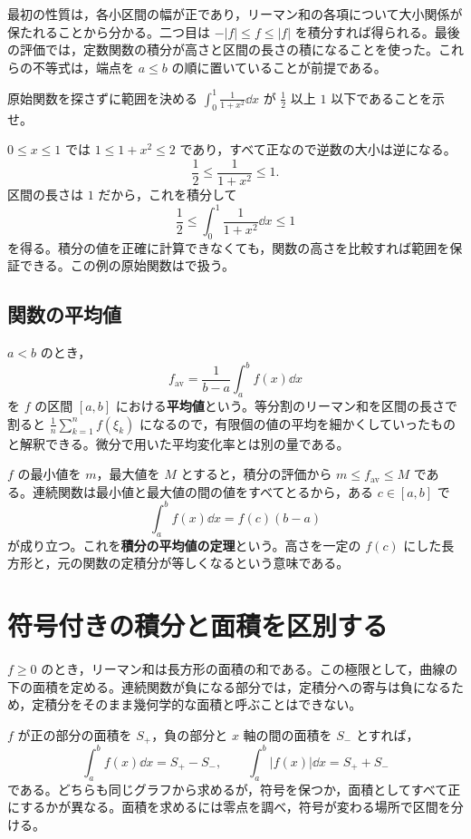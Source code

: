 最初の性質は，各小区間の幅が正であり，リーマン和の各項について大小関係が保たれることから分かる。二つ目は $-|f|\le f\le|f|$ を積分すれば得られる。最後の評価では，定数関数の積分が高さと区間の長さの積になることを使った。これらの不等式は，端点を $a\le b$ の順に置いていることが前提である。

\begin{example}{原始関数を探さずに範囲を決める}
$\int_0^1\frac1{1+x^2}\dd x$ が $\frac12$ 以上 $1$ 以下であることを示せ。
\end{example}
$0\le x\le1$ では $1\le1+x^2\le2$ であり，すべて正なので逆数の大小は逆になる。
\[
 \frac12\le\frac1{1+x^2}\le1.
\]
区間の長さは $1$ だから，これを積分して
\[
 \frac12\le\int_0^1\frac1{1+x^2}\dd x\le1
\]
を得る。積分の値を正確に計算できなくても，関数の高さを比較すれば範囲を保証できる。この例の原始関数はで扱う。

\subsection{関数の平均値}
$a<b$ のとき，
\[
 f_{\mathrm{av}}=\frac1{b-a}\int_a^b f(x)\dd x
\]
を $f$ の区間 $[a,b]$ における\textbf{平均値}という。等分割のリーマン和を区間の長さで割ると $\frac1n\sum_{k=1}^{n}f(\xi_k)$ になるので，有限個の値の平均を細かくしていったものと解釈できる。微分で用いた平均変化率とは別の量である。

$f$ の最小値を $m$，最大値を $M$ とすると，積分の評価から $m\le f_{\mathrm{av}}\le M$ である。連続関数は最小値と最大値の間の値をすべてとるから，ある $c\in[a,b]$ で
\[
 \int_a^b f(x)\dd x=f(c)(b-a)
\]
が成り立つ。これを\textbf{積分の平均値の定理}という。高さを一定の $f(c)$ にした長方形と，元の関数の定積分が等しくなるという意味である。

\section{符号付きの積分と面積を区別する}\label{節:積分符号面積}
$f\ge0$ のとき，リーマン和は長方形の面積の和である。この極限として，曲線の下の面積を定める。連続関数が負になる部分では，定積分への寄与は負になるため，定積分をそのまま幾何学的な面積と呼ぶことはできない。

$f$ が正の部分の面積を $S_+$，負の部分と $x$ 軸の間の面積を $S_-$ とすれば，
\[
 \int_a^b f(x)\dd x=S_+-S_-,\qquad
 \int_a^b|f(x)|\dd x=S_++S_-
\]
である。どちらも同じグラフから求めるが，符号を保つか，面積としてすべて正にするかが異なる。面積を求めるには零点を調べ，符号が変わる場所で区間を分ける。

